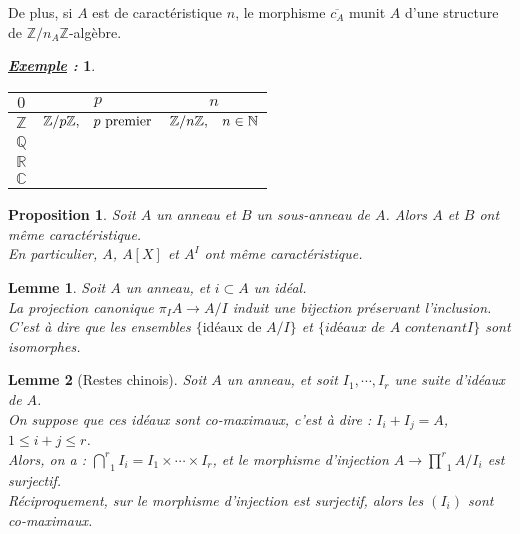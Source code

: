 \documentclass{article}           %
\newcommand\N{\mathbb{N}}
\newcommand\Z{\mathbb{Z}}
\newcommand\Q{\mathbb{Q}}
\newcommand\R{\mathbb{R}}
\newcommand\C{\mathbb{C}}
\newcommand\prodd[2]{\underset{#1}{\overset{#2}{\prod}}} 	%
\newcommand\capp[2]{\underset{#1}{\overset{#2}{\bigcap}}} 	%
\newcommand\tq{\hspace{0.3cm}} 		%
\theoremstyle{break}
\theoremstyle{add}
\theoremstyle{break} %
\newtheorem{lemme}{Lemme}[section]
\newtheorem{proposition}{Proposition}[section]
\theoremstyle{add}
\newtheorem*{exemple}{\textit{\underline{Exemple} :}}
\newcommand\NL{
\mbox{}
\vspace*{-\parsep}
\vspace*{-\baselineskip}}
\begin{document}

De plus, si $A$ est de caractéristique $n$, le morphisme $\overline{c_A}$ munit $A$ d'une structure de $\Z/n_A \Z$-algèbre. \\


\begin{exemple}\NL
\begin{tabular}{|c|c|c|}
\hline
$0$ & $p$ & $n$ \\
\hline
$\Z$ & $\Z/p\Z, \tq p \textrm{ premier}$ & $\Z/n\Z, \tq n \in \N$ \\
\hline
$\Q$ &&\\
\hline
$\R$ &&\\
\hline
$\C$ &&\\
\hline
\end{tabular}
\end{exemple}

\begin{proposition}
Soit $A$ un anneau et $B$ un sous-anneau de $A$. Alors $A$ et $B$ ont même caractéristique. \\
En particulier, $A$, $A[X]$ et $A^I$ ont même caractéristique.
\end{proposition}


\begin{lemme}
Soit $A$ un anneau, et $i \subset A$ un idéal. \\
La projection canonique $\pi_I A \rightarrow A/I$ induit une bijection préservant l'inclusion. C'est à dire que les ensembles $\{\textrm{idéaux de } A/I \}$ et $\{\textit{idéaux de $A$ contenant} I \}$ sont isomorphes.
\end{lemme}

\begin{lemme}[Restes chinois]
Soit $A$ un anneau, et soit $I_1, \cdots, I_r$ une suite d'idéaux de $A$. \\
On suppose que ces idéaux sont co-maximaux, c'est à dire : $I_i + I_j = A$, $1 \leq i+j \leq r$. \\
Alors, on a : $\capp{1}{r} I_i = I_1 \times \cdots \times I_r$, et le morphisme d'injection $A \rightarrow \prodd{1}{r} A/I_i$ est surjectif. \\

Réciproquement, sur le morphisme d'injection est surjectif, alors les $(I_i)$ sont co-maximaux.
\end{lemme}
\end{document}
